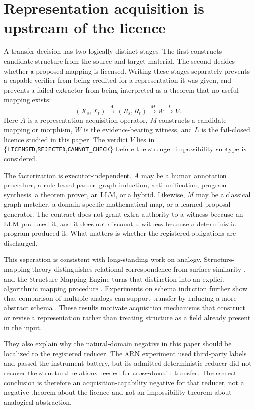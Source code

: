 \section{Representation acquisition is upstream of the licence}\label{sec:acquisition-licence}

A transfer decision has two logically distinct stages. The first constructs candidate structure from the source and target material. The second decides whether a proposed mapping is licensed. Writing these stages separately prevents a capable verifier from being credited for a representation it was given, and prevents a failed extractor from being interpreted as a theorem that no useful mapping exists:
\[
(X_s,X_t)\xrightarrow{A}(R_s,R_t)\xrightarrow{M}W\xrightarrow{L}V.
\]
Here $A$ is a representation-acquisition operator, $M$ constructs a candidate mapping or morphism, $W$ is the evidence-bearing witness, and $L$ is the fail-closed licence studied in this paper. The verdict $V$ lies in \{\texttt{LICENSED},\texttt{REJECTED},\texttt{CANNOT\_CHECK}\} before the stronger impossibility subtype is considered.

The factorization is executor-independent. $A$ may be a human annotation procedure, a rule-based parser, graph induction, anti-unification, program synthesis, a theorem prover, an LLM, or a hybrid. Likewise, $M$ may be a classical graph matcher, a domain-specific mathematical map, or a learned proposal generator. The contract does not grant extra authority to a witness because an LLM produced it, and it does not discount a witness because a deterministic program produced it. What matters is whether the registered obligations are discharged.

This separation is consistent with long-standing work on analogy. Structure-mapping theory distinguishes relational correspondence from surface similarity \cite{gentner1983structure}, and the Structure-Mapping Engine turns that distinction into an explicit algorithmic mapping procedure \cite{falkenhainer1989sme}. Experiments on schema induction further show that comparison of multiple analogs can support transfer by inducing a more abstract schema \cite{gick1983schema}. These results motivate acquisition mechanisms that construct or revise a representation rather than treating structure as a field already present in the input.

They also explain why the natural-domain negative in this paper should be localized to the registered reducer. The ARN experiment used third-party labels and passed the instrument battery, but its admitted deterministic reducer did not recover the structural relations needed for cross-domain transfer. The correct conclusion is therefore an acquisition-capability negative for that reducer, not a negative theorem about the licence and not an impossibility theorem about analogical abstraction.

